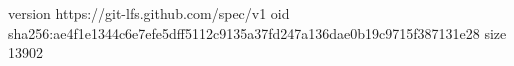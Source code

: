 version https://git-lfs.github.com/spec/v1
oid sha256:ae4f1e1344c6e7efe5dff5112c9135a37fd247a136dae0b19c9715f387131e28
size 13902
